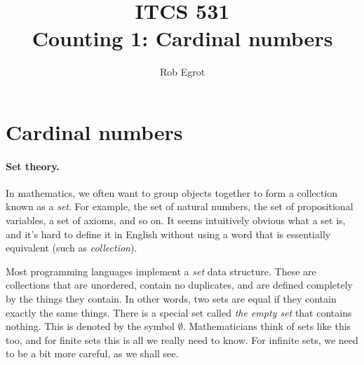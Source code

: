 \documentclass{article}
\title{ITCS 531 \\Counting 1: Cardinal numbers}
\author{Rob Egrot}
\date{}
\theoremstyle{plain}
\begin{document}
\maketitle

\section{Cardinal numbers}

\paragraph{Set theory.}
In mathematics, we often want to group objects together to form a collection known as a \emph{set}. For example, the set of natural numbers, the set of propositional variables, a set of axioms, and so on. It seems intuitively obvious what a set is, and it's hard to define it in English without using a word that is essentially equivalent (such as \emph{collection}). 

Most programming languages implement a \emph{set} data structure. These are collections that are unordered, contain no duplicates, and are defined completely by the things they contain. In other words, two sets are equal if they contain exactly the same things. There is a special set called \emph{the empty set} that contains nothing. This is denoted by the symbol $\emptyset$. Mathematicians think of sets like this too, and for finite sets this is all we really need to know. For infinite sets, we need to be a bit more careful, as we shall see. 
\end{document}
